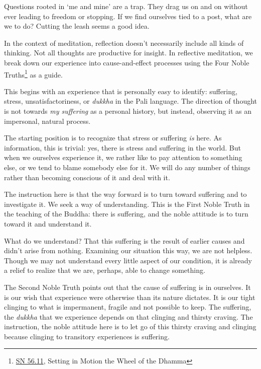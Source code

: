 \enlargethispage*{\baselineskip}

Questions rooted in `me and mine' are a trap. They drag us on and on
without ever leading to freedom or stopping. If we find ourselves tied
to a post, what are we to do? Cutting the leash seems a good idea.

In the context of meditation, reflection doesn't necessarily include all
kinds of thinking. Not all thoughts are productive for insight. In
reflective meditation, we break down our experience into
cause-and-effect processes using the Four Noble Truths\footnote{\href{https://suttacentral.net/sn56.11}{SN
  56.11}, Setting in Motion the Wheel of the Dhamma} as a guide.

This begins with an experience that is personally easy to identify:
suffering, stress, unsatisfactoriness, or \emph{dukkha} in the Pali
language. The direction of thought is not towards \emph{my suffering} as
a personal history, but instead, observing it as an impersonal, natural
process.


The starting position is to recognize that stress or suffering \emph{is}
here. As information, this is trivial: yes, there is stress and
suffering in the world. But when we ourselves experience it, we rather
like to pay attention to something else, or we tend to blame somebody
else for it. We will do any number of things rather than becoming
conscious of it and deal with it.

The instruction here is that the way forward is to turn toward suffering
and to investigate it. We seek a way of understanding. This is the First
Noble Truth in the teaching of the Buddha: there is suffering, and the
noble attitude is to turn toward it and understand it.

What do we understand? That this suffering is the result of earlier
causes and didn't arise from nothing. Examining our situation this way,
we are not helpless. Though we may not understand every little aspect of
our condition, it is already a relief to realize that we are, perhaps,
able to change something.

\clearpage


The Second Noble Truth points out that the cause of suffering is in
ourselves. It is our wish that experience were otherwise than its nature
dictates. It is our tight clinging to what is impermanent, fragile and
not possible to keep. The suffering, the \emph{dukkha} that we
experience depends on that clinging and thirsty craving. The
instruction, the noble attitude here is to let go of this thirsty
craving and clinging because clinging to transitory experiences is
suffering.

